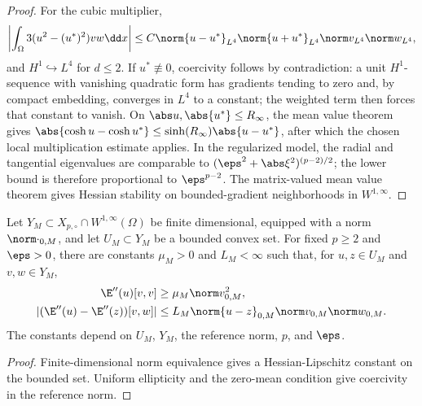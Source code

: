 \begin{proof}
For the cubic multiplier,
\[
 \left|\int_\Omega3(u^2-(u^*)^2)vw\dd x\right|
 \leq C\norm{u-u^*}_{L^4}\norm{u+u^*}_{L^4}
 \norm v_{L^4}\norm w_{L^4},
\]
and \(H^1\hookrightarrow L^4\) for \(d\leq2\). If \(u^*\not\equiv0\), coercivity follows by
contradiction: a unit \(H^1\)-sequence with vanishing quadratic form has gradients tending to zero and,
by compact embedding, converges in \(L^4\) to a constant; the weighted term then forces that constant
to vanish. On \(\abs u,\abs{u^*}\leq R_\infty\), the mean
value theorem gives
\(\abs{\cosh u-\cosh u^*}\leq\sinh(R_\infty)\abs{u-u^*}\), after which the chosen local
multiplication estimate applies. In the regularized model, the radial and tangential eigenvalues are
comparable to \((\eps^2+\abs\xi^2)^{(p-2)/2}\); the lower bound is therefore proportional to
\(\eps^{p-2}\). The matrix-valued mean value theorem gives Hessian stability on bounded-gradient neighborhoods in \(W^{1,\infty}\).
\end{proof}

\begin{proposition}
\label{prop:regularized-restricted}
Let \(Y_M\subset X_{p,\circ}\cap W^{1,\infty}(\Omega)\) be finite dimensional, equipped with a norm \(\norm\cdot_{0,M}\), and let \(U_M\subset Y_M\) be a bounded convex set. For fixed \(p\ge2\) and \(\eps>0\), there are constants \(\mu_M>0\) and \(L_M<\infty\) such that, for \(u,z\in U_M\) and \(v,w\in Y_M\),
\[
 \begin{aligned}
 \E''(u)[v,v]&\ge\mu_M\norm v_{0,M}^2,\\
 |(\E''(u)-\E''(z))[v,w]|
 &\le L_M\norm{u-z}_{0,M}\norm v_{0,M}\norm w_{0,M}.
 \end{aligned}
\]
The constants depend on \(U_M\), \(Y_M\), the reference norm, \(p\), and \(\eps\).
\end{proposition}

\begin{proof}
Finite-dimensional norm equivalence gives a Hessian-Lipschitz constant on the bounded set. Uniform ellipticity and the zero-mean condition give coercivity in the reference norm.
\end{proof}


